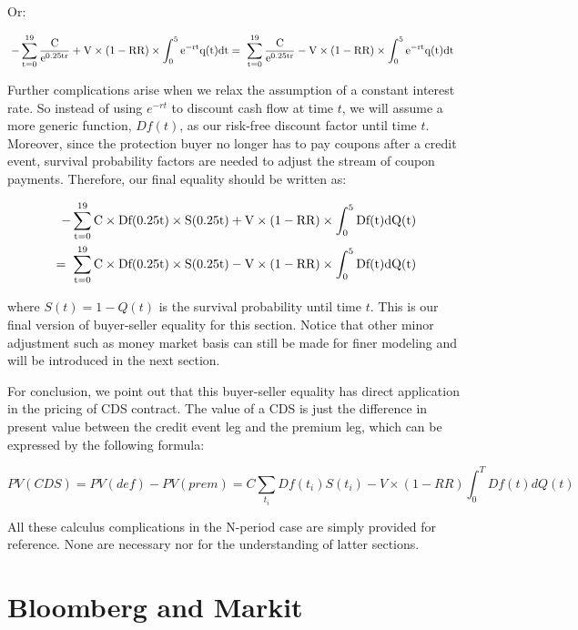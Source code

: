 \documentclass{jss}
\begin{document}
Or:

\begin{align}
  \rm \hspace{3pt}- \sum_{t = 0}^{19} \frac{C}{e^{0.25tr}} + V \times (1 - RR) \times \int_0^5 e^{-rt}q(t)dt  &= \rm \hspace{3pt} \sum_{t = 0}^{19} \frac{C}{e^{0.25tr}} - V \times (1 - RR) \times \int_0^5 e^{-rt}q(t)dt 
\end{align}

Further complications arise when we relax the assumption of a constant interest rate. So instead of using $e^{-rt}$ to discount cash flow at time $t$, we will assume a more generic function, $Df(t)$, as our risk-free discount factor until time $t$. Moreover, since the protection buyer no longer has to pay coupons after a credit event, survival probability factors are needed to adjust the stream of coupon payments. Therefore, our final equality should be written as:

\begin{align}
  \rm \hspace{3pt}- \sum_{t = 0}^{19} C\times Df(0.25t) \times S(0.25t) + V \times (1 - RR) \times \int_0^5 Df(t)dQ(t)  \\
  = \rm \hspace{3pt} \sum_{t = 0}^{19} C\times Df(0.25t) \times S(0.25t)  - V \times (1 - RR) \times \int_0^5 Df(t)dQ(t) 
\end{align}

where $S(t) = 1 - Q(t)$ is the survival probability until time $t$. This is our final version of buyer-seller equality for this section. Notice that other minor adjustment such as money market basis can still be made for finer modeling and will be introduced in the next section.

For conclusion, we point out that this buyer-seller equality has direct application in the pricing of CDS contract. The value of a CDS is just the difference in present value between the credit event leg and the premium leg, which can be expressed by the following formula:

$$PV(CDS) = PV(def) - PV(prem) = C\sum_{t_i}Df(t_i)S(t_i) - V\times(1 - RR)\int_0^T Df(t)dQ(t)$$

All these calculus complications in the N-period case are simply provided for reference.
None are necessary nor for the understanding of latter sections.


\section{Bloomberg and Markit}
\label{sec:BloombergMarkit}
\end{document}
